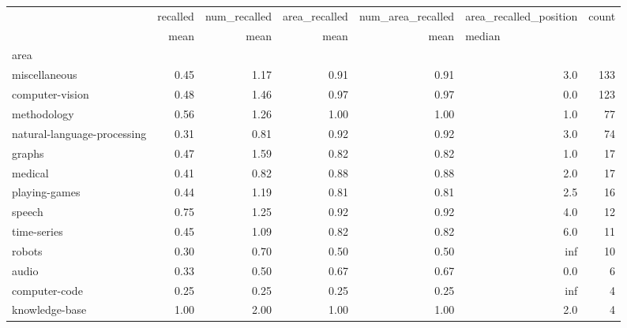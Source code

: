 \documentclass[11pt]{report}
\begin{document}
{
\color{red}
\begin{center}
\begin{tabular}{p{1cm}rrrrrr}
\toprule
{} & recalled & num\_recalled & area\_recalled & num\_area\_recalled & area\_recalled\_position & count \\
{} &     mean &         mean &          mean &              mean & \multicolumn{2}{l}{median} \\
area                        &          &              &               &                   &                        &       \\
\midrule
miscellaneous               &     0.45 &         1.17 &          0.91 &              0.91 &                    3.0 &   133 \\
computer-vision             &     0.48 &         1.46 &          0.97 &              0.97 &                    0.0 &   123 \\
methodology                 &     0.56 &         1.26 &          1.00 &              1.00 &                    1.0 &    77 \\
natural-language-processing &     0.31 &         0.81 &          0.92 &              0.92 &                    3.0 &    74 \\
graphs                      &     0.47 &         1.59 &          0.82 &              0.82 &                    1.0 &    17 \\
medical                     &     0.41 &         0.82 &          0.88 &              0.88 &                    2.0 &    17 \\
playing-games               &     0.44 &         1.19 &          0.81 &              0.81 &                    2.5 &    16 \\
speech                      &     0.75 &         1.25 &          0.92 &              0.92 &                    4.0 &    12 \\
time-series                 &     0.45 &         1.09 &          0.82 &              0.82 &                    6.0 &    11 \\
robots                      &     0.30 &         0.70 &          0.50 &              0.50 &                    inf &    10 \\
audio                       &     0.33 &         0.50 &          0.67 &              0.67 &                    0.0 &     6 \\
computer-code               &     0.25 &         0.25 &          0.25 &              0.25 &                    inf &     4 \\
knowledge-base              &     1.00 &         2.00 &          1.00 &              1.00 &                    2.0 &     4 \\

\end{tabular}
\end{center}}
\end{document}
